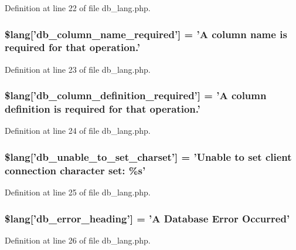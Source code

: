 Definition at line 22 of file db\-\_\-lang.\-php.

\hypertarget{db__lang_8php_ac87ab86a1f105d87327480b6d0659b13}{
\subsubsection[{\$lang}]{\setlength{\rightskip}{0pt plus 5cm}\$lang\mbox{[}'db\-\_\-column\-\_\-name\-\_\-required'\mbox{]} = 'A column name is required {\bf for} that operation.'}}\label{db__lang_8php_ac87ab86a1f105d87327480b6d0659b13}


Definition at line 23 of file db\-\_\-lang.\-php.

\hypertarget{db__lang_8php_ad0ba270704ec81f8f89e486a18660354}{
\subsubsection[{\$lang}]{\setlength{\rightskip}{0pt plus 5cm}\$lang\mbox{[}'db\-\_\-column\-\_\-definition\-\_\-required'\mbox{]} = 'A column definition is required {\bf for} that operation.'}}\label{db__lang_8php_ad0ba270704ec81f8f89e486a18660354}


Definition at line 24 of file db\-\_\-lang.\-php.

\hypertarget{db__lang_8php_ab22396948e25460833329cb8786ad831}{
\subsubsection[{\$lang}]{\setlength{\rightskip}{0pt plus 5cm}\$lang\mbox{[}'db\-\_\-unable\-\_\-to\-\_\-set\-\_\-charset'\mbox{]} = 'Unable {\bf to} set client connection character set\-: \%s'}}\label{db__lang_8php_ab22396948e25460833329cb8786ad831}


Definition at line 25 of file db\-\_\-lang.\-php.

\hypertarget{db__lang_8php_a4be34cea2490b0d41689b65e52286658}{
\subsubsection[{\$lang}]{\setlength{\rightskip}{0pt plus 5cm}\$lang\mbox{[}'db\-\_\-error\-\_\-heading'\mbox{]} = 'A Database Error Occurred'}}\label{db__lang_8php_a4be34cea2490b0d41689b65e52286658}


Definition at line 26 of file db\-\_\-lang.\-php.

